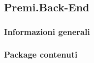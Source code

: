 \subsection{Premi.Back-End}

\subsubsection{Informazioni generali}

\subsubsection{Package contenuti}
